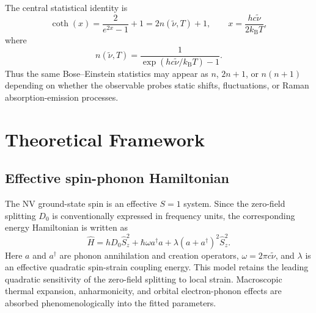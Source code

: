 \documentclass[12pt,a4paper]{article}
\begin{document}
The central statistical identity is
\begin{equation}
\coth(x)=\frac{2}{e^{2x}-1}+1=2n(\tilde{\nu},T)+1, \qquad x=\frac{hc\tilde{\nu}}{2k_{\mathrm B}T},
\label{eq:coth_identity}
\end{equation}
where
\begin{equation}
n(\tilde{\nu},T)= \frac{1}{\exp(hc\tilde{\nu}/k_{\mathrm B}T)-1}.
\end{equation}
Thus the same Bose--Einstein statistics may appear as $n$, $2n+1$, or $n(n+1)$ depending on whether the observable probes static shifts, fluctuations, or Raman absorption-emission processes.

\section{Theoretical Framework}
\label{sec:theory}

\subsection{Effective spin-phonon Hamiltonian}
The NV ground-state spin is an effective $S=1$ system. Since the zero-field splitting $D_0$ is conventionally expressed in frequency units, the corresponding energy Hamiltonian is written as
\begin{equation}
\boxed{
\hat H = hD_0\hat S_z^2 + \hbar\omega a^\dagger a + \lambda(a+a^\dagger)^2\hat S_z^2
} .
\label{eq:effective_hamiltonian}
\end{equation}
Here $a$ and $a^\dagger$ are phonon annihilation and creation operators, $\omega=2\pi c\tilde{\nu}$, and $\lambda$ is an effective quadratic spin-strain coupling energy. This model retains the leading quadratic sensitivity of the zero-field splitting to local strain. Macroscopic thermal expansion, anharmonicity, and orbital electron-phonon effects are absorbed phenomenologically into the fitted parameters.
\end{document}
